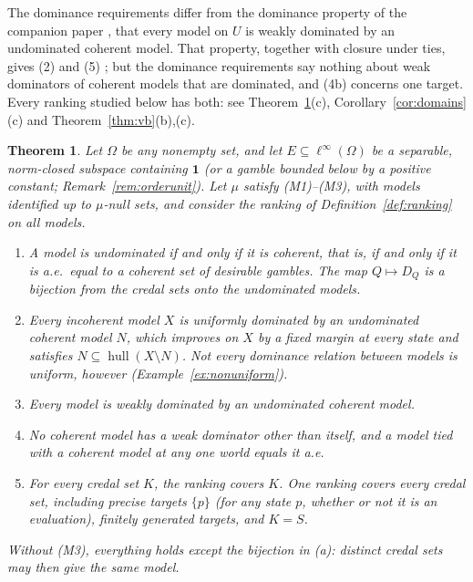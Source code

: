 \documentclass[11pt]{article}
\newcommand{\one}{\mathbf{1}}
\newcommand{\hull}{\operatorname{hull}}
\theoremstyle{plain}
\newtheorem{theorem}{Theorem}[section]
\theoremstyle{definition}
\theoremstyle{remark}
\begin{document}
The dominance requirements differ from the dominance property of the companion paper
\cite{KCMcompanion}, that every model on $U$ is weakly dominated by an undominated coherent model.
That property, together with closure under ties, gives (2) and (5) \cite[Proposition~6.1(a)]{KCMcompanion}; but the dominance requirements say nothing about weak dominators of coherent models that are dominated, and (4b)
concerns one target. Every ranking studied below has both: see Theorem~\ref{thm:main}(c),
Corollary~\ref{cor:domains}(c) and Theorem~\ref{thm:vb}(b),(c).

\begin{theorem}\label{thm:main}
Let $\Omega$ be any nonempty set, and let $E\subseteq\ell^\infty(\Omega)$ be a separable,
norm-closed subspace containing $\one$ (or a gamble bounded below by a positive constant;
Remark~\ref{rem:orderunit}). Let $\mu$ satisfy \mbox{(M1)--(M3)}, with models identified up to
$\mu$-null sets, and consider the ranking of Definition~\ref{def:ranking} on all models.
\begin{enumerate}[label=(\alph*)]
  \item A model is undominated if and only if it is coherent, that is, if and only if it is
  a.e.\ equal to a coherent set of desirable gambles. The map $Q\mapsto D_Q$ is a bijection from
  the credal sets onto the undominated models.
  \item Every incoherent model $X$ is uniformly dominated by an undominated coherent model $N$,
  which improves on $X$ by a fixed margin at every state and satisfies $N\subseteq\hull(X
  \setminus N)$. Not every dominance relation between models is uniform, however
  (Example~\ref{ex:nonuniform}).
  \item Every model is weakly dominated by an undominated coherent model.
  \item No coherent model has a weak dominator other than itself, and a model tied with a
  coherent model at any one world equals it a.e.
  \item For every credal set $K$, the ranking covers $K$. One ranking covers every credal set,
  including precise targets $\{p\}$ (for any state $p$, whether or not it is an evaluation),
  finitely generated targets, and $K=S$.
\end{enumerate}
Without (M3), everything holds except the bijection in (a): distinct credal sets may then give
the same model.
\end{theorem}
\end{document}
